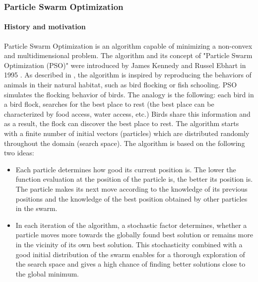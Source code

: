 \subsubsection{Particle Swarm Optimization}\label{PSO_s}
\paragraph{History and motivation}
Particle Swarm Optimization is an algorithm capable of minimizing a non-convex and multidimensional problem. The algorithm and its concept of "Particle Swarm Optimization (PSO)" were introduced by James Kennedy and Russel Ebhart in 1995 \cite{Kennedy1995}. As described in \cite[1]{PSO}, the algorithm is inspired by reproducing the behaviors of animals in their natural habitat, such as bird flocking or fish schooling. PSO simulates the flocking behavior of birds. The analogy is the following: each bird in a bird flock, searches for the best place to rest (the best place can be characterized by food access, water access, etc.) Birds share this information and as a result, the flock can discover the best place to rest. The algorithm starts with a finite number of initial vectors (particles) which are distributed randomly throughout the domain (search space). The algorithm is based on the following two ideas:
\begin{itemize}
    \item Each particle determines how good its current position is. The lower the function evaluation at the position of the particle is, the better its position is. The particle makes its next move according to the knowledge of its previous positions and the knowledge of the best position obtained by other particles in the swarm. 
    \item In each iteration of the algorithm, a stochastic factor determines, whether a particle moves more towards the globally found best solution or remains more in the vicinity of its own best solution. This stochasticity combined with a good initial distribution of the swarm enables for a thorough exploration of the search space and gives a high chance of finding better solutions close to the global minimum.
\end{itemize}
